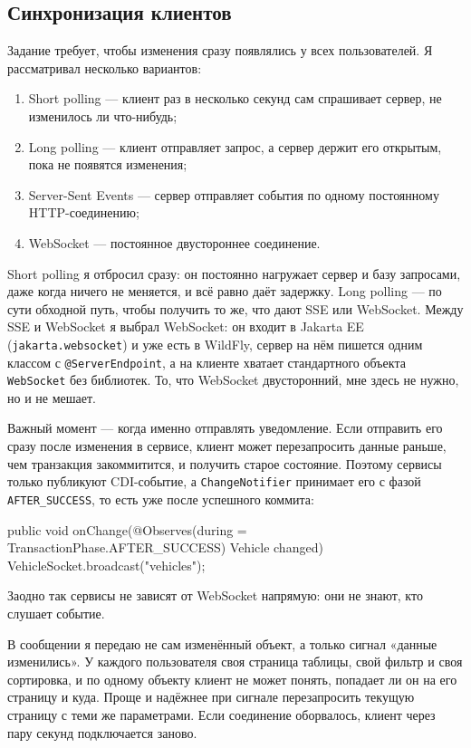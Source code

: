 \documentclass[a4paper,12pt]{article}
\begin{document}
\subsection{Синхронизация клиентов}

Задание требует, чтобы изменения сразу появлялись у всех пользователей. Я рассматривал несколько вариантов:

\begin{enumerate}[leftmargin=1.2cm]
    \item Short polling --- клиент раз в несколько секунд сам спрашивает сервер, не изменилось ли что-нибудь;
    \item Long polling --- клиент отправляет запрос, а сервер держит его открытым, пока не появятся изменения;
    \item Server-Sent Events --- сервер отправляет события по одному постоянному HTTP-соединению;
    \item WebSocket --- постоянное двустороннее соединение.
\end{enumerate}

Short polling я отбросил сразу: он постоянно нагружает сервер и базу запросами, даже когда ничего не меняется, и всё равно даёт задержку. Long polling --- по сути обходной путь, чтобы получить то же, что дают SSE или WebSocket. Между SSE и WebSocket я выбрал WebSocket: он входит в Jakarta EE (\texttt{jakarta.websocket}) и уже есть в WildFly, сервер на нём пишется одним классом с \texttt{@ServerEndpoint}, а на клиенте хватает стандартного объекта \texttt{WebSocket} без библиотек. То, что WebSocket двусторонний, мне здесь не нужно, но и не мешает.

Важный момент --- когда именно отправлять уведомление. Если отправить его сразу после изменения в сервисе, клиент может перезапросить данные раньше, чем транзакция закоммитится, и получить старое состояние. Поэтому сервисы только публикуют CDI-событие, а \texttt{ChangeNotifier} принимает его с фазой \texttt{AFTER\_SUCCESS}, то есть уже после успешного коммита:

\begin{code}
public void onChange(@Observes(during =                   TransactionPhase.AFTER_SUCCESS) Vehicle changed) {
    VehicleSocket.broadcast("vehicles");
}
\end{code}

Заодно так сервисы не зависят от WebSocket напрямую: они не знают, кто слушает событие.

В сообщении я передаю не сам изменённый объект, а только сигнал «данные изменились». У каждого пользователя своя страница таблицы, свой фильтр и своя сортировка, и по одному объекту клиент не может понять, попадает ли он на его страницу и куда. Проще и надёжнее при сигнале перезапросить текущую страницу с теми же параметрами. Если соединение оборвалось, клиент через пару секунд подключается заново.
\end{document}
